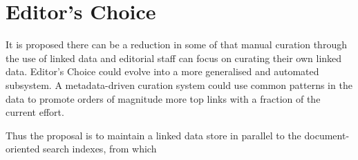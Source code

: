 \section{Editor's Choice}

It is proposed there can be
a reduction in some of that manual curation through the use
of linked data and editorial staff can focus on curating
their own linked data. Editor's Choice could evolve into a more
generalised and automated subsystem. A metadata-driven curation system
could use common patterns in the data to promote orders of magnitude more
top links with a fraction of the current effort.

Thus the proposal is to maintain a linked data store in parallel
to the document-oriented search indexes, from which 
